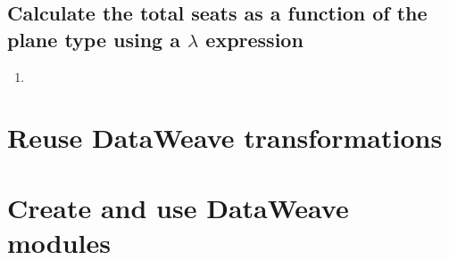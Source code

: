 \subsection{Calculate the total seats as a function of the plane type using a $\lambda$ expression}
\begin{enumerate}[resume*]
\item
\end{enumerate}

\section{Reuse DataWeave transformations}



\section{Create and use DataWeave modules}

